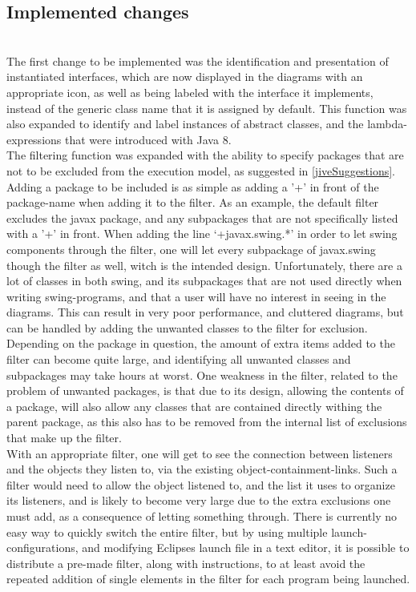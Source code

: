 \subsection{Implemented changes}\label{jiveImpl}%
~\\

The first change to be implemented was the identification and presentation of instantiated interfaces, which are now displayed in the diagrams with an appropriate icon, as well as being labeled with the interface it implements, instead of the generic class name that it is assigned by default.
This function was also expanded to identify and label instances of abstract classes, and the lambda-expressions that were introduced with Java 8.%
~\\

The filtering function was expanded with the ability to specify packages that are not to be excluded from the execution model, as suggested in \autoref{jiveSuggestions}.
Adding a package to be included is as simple as adding a '+' in front of the package-name when adding it to the filter.
As an example, the default filter excludes the javax package, and any subpackages that are not specifically listed with a '+' in front.
When adding the line `+javax.swing.*' in order to let swing components through the filter, one will let every subpackage of javax.swing though the filter as well, witch is the intended design.
Unfortunately, there are a lot of classes in both swing, and its subpackages that are not used directly when writing swing-programs, and that a user will have no interest in seeing in the diagrams.
This can result in very poor performance, and cluttered diagrams, but can be handled by adding the unwanted classes to the filter for exclusion.
Depending on the package in question, the amount of extra items added to the filter can become quite large, and identifying all unwanted classes and subpackages may take hours at worst.
One weakness in the filter, related to the problem of unwanted packages, is that due to its design, allowing the contents of a package, will also allow any classes that are contained directly withing the parent package, as this also has to be removed from the internal list of exclusions that make up the filter.
~\\

With an appropriate filter, one will get to see the connection between listeners and the objects they listen to, via the existing object-containment-links.
Such a filter would need to allow the object listened to, and the list it uses to organize its listeners, and is likely to become very large due to the extra exclusions one must add, as a consequence of letting something through.
There is currently no easy way to quickly switch the entire filter, but by using multiple launch-configurations, and modifying Eclipses launch file in a text editor, it is possible to distribute a pre-made filter, along with instructions, to at least avoid the repeated addition of single elements in the filter for each program being launched.
~\\

